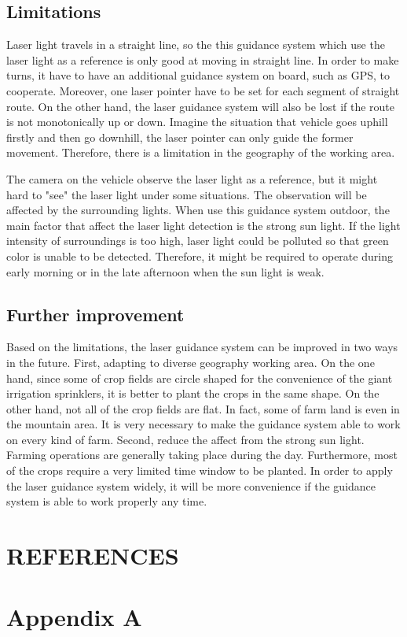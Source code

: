\documentclass[12pt]{article}
\begin{document}
\begin{flushleft}
\subsection{Limitations}
Laser light travels in a straight line, so the this guidance system which use the laser light as a reference is only good at moving in straight line. In order to make turns, it have to have an additional guidance system on board, such as GPS, to cooperate. Moreover, one laser pointer have to be set for each segment of straight route. On the other hand, the laser guidance system will also be lost if the route is not monotonically up or down. Imagine the situation that vehicle goes uphill firstly and then go downhill, the laser pointer can only guide the former movement. Therefore, there is a limitation in the geography of the working area.

The camera on the vehicle observe the laser light as a reference, but it might hard to "see" the laser light under some situations. The observation will be affected by the surrounding lights. When use this guidance system outdoor, the main factor that affect the laser light detection is the strong sun light. If the light intensity of surroundings is too high, laser light could be polluted so that green color is unable to be detected. Therefore, it might be required to operate during early morning or in the late afternoon when the sun light is weak. 

\subsection{Further improvement}
Based on the limitations, the laser guidance system can be improved in two ways in the future. First, adapting to diverse geography working area. On the one hand, since some of crop fields are circle shaped for the convenience of the giant irrigation sprinklers, it is better to plant the crops in the same shape. On the other hand, not all of the crop fields are flat. In fact, some of farm land is even in the mountain area. It is very necessary to make the guidance system able to work on every kind of farm. Second, reduce the affect from the strong sun light. Farming operations are generally taking place during the day. Furthermore, most of the crops require a very limited time window to be planted. In order to apply the laser guidance system widely, it will be more convenience if the guidance system is able to work properly any time. 





\newpage
\section{REFERENCES}



\newpage
\appendix
\renewcommand{\appendixname}{Appendix~\Alph{section}}

\section{Appendix A}


\end{flushleft}
\end{document}
